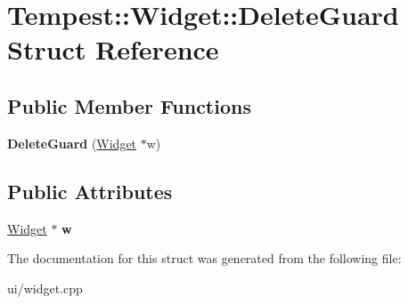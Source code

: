 \hypertarget{struct_widget_1_1_delete_guard}{\section{Tempest\+:\+:Widget\+:\+:Delete\+Guard Struct Reference}
\label{struct_widget_1_1_delete_guard}
}
\subsection*{Public Member Functions}
\begin{DoxyCompactItemize}
\item 
\hypertarget{struct_widget_1_1_delete_guard_aa002746dc08f0647df132beda54f84e5}{{\bfseries Delete\+Guard} (\hyperlink{class_tempest_1_1_widget}{Widget} $\ast$w)}\label{struct_widget_1_1_delete_guard_aa002746dc08f0647df132beda54f84e5}

\end{DoxyCompactItemize}
\subsection*{Public Attributes}
\begin{DoxyCompactItemize}
\item 
\hypertarget{struct_widget_1_1_delete_guard_a9365c0d1f771c3fc73acab9c6274bd85}{\hyperlink{class_tempest_1_1_widget}{Widget} $\ast$ {\bfseries w}}\label{struct_widget_1_1_delete_guard_a9365c0d1f771c3fc73acab9c6274bd85}

\end{DoxyCompactItemize}


The documentation for this struct was generated from the following file\+:\begin{DoxyCompactItemize}
\item 
ui/widget.\+cpp\end{DoxyCompactItemize}
